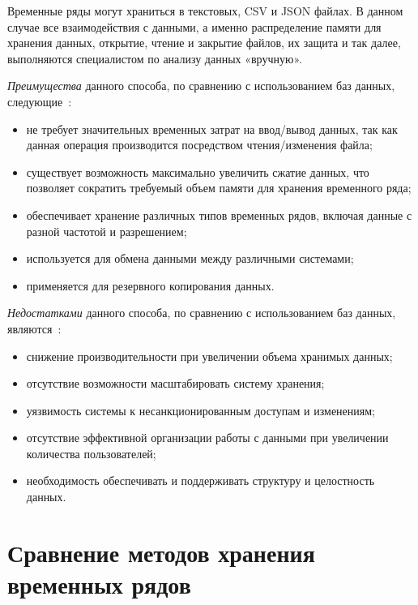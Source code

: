Временные ряды могут храниться в текстовых, CSV и JSON файлах.
В данном случае все взаимодействия с данными, а именно распределение памяти для хранения данных, открытие,
чтение и закрытие файлов, их защита и так далее, выполняются специалистом по анализу данных «вручную».

\textit{Преимущества} данного способа, по сравнению с использованием баз данных, следующие~\cite{poliref1}:

\begin{itemize}
\item не требует значительных временных затрат на ввод/вывод данных, так как данная операция производится посредством чтения/изменения файла;
\item существует возможность максимально увеличить сжатие данных, что позволяет сократить требуемый объем памяти для хранения временного ряда;
\item обеспечивает хранение различных типов временных рядов, включая данные с разной частотой и разрешением;
\item используется для обмена данными между различными системами;
\item применяется для резервного копирования данных.
\end{itemize}

\textit{Недостатками} данного способа, по сравнению с использованием баз данных, являются~\cite{poliref1}:

\begin{itemize}
\item снижение производительности при увеличении объема хранимых данных;
\item отсутствие возможности масштабировать систему хранения;
\item уязвимость системы к несанкционированным доступам и изменениям;
\item отсутствие эффективной организации работы с данными при увеличении количества пользователей;
\item необходимость обеспечивать и поддерживать структуру и целостность данных.
\end{itemize}

\section{Сравнение методов хранения временных рядов}

